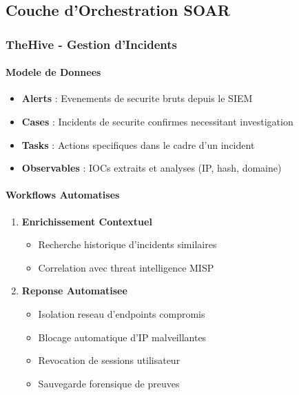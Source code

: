 \subsection{Couche d'Orchestration SOAR}

\subsubsection{TheHive - Gestion d'Incidents}

\paragraph{Modele de Donnees}
\begin{itemize}
    \item \textbf{Alerts} : Evenements de securite bruts depuis le SIEM
    \item \textbf{Cases} : Incidents de securite confirmes necessitant investigation
    \item \textbf{Tasks} : Actions specifiques dans le cadre d'un incident
    \item \textbf{Observables} : IOCs extraits et analyses (IP, hash, domaine)
\end{itemize}

\paragraph{Workflows Automatises}
\begin{enumerate}
    \item \textbf{Enrichissement Contextuel}
          \begin{itemize}
              \item Recherche historique d'incidents similaires
              \item Correlation avec threat intelligence MISP
          \end{itemize}

    \item \textbf{Reponse Automatisee}
          \begin{itemize}
              \item Isolation reseau d'endpoints compromis
              \item Blocage automatique d'IP malveillantes
              \item Revocation de sessions utilisateur
              \item Sauvegarde forensique de preuves
          \end{itemize}
\end{enumerate}


